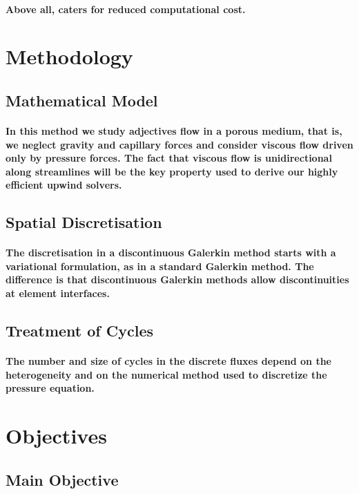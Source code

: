 \documentclass{article}
\begin{document}
	\paragraph{Above all, caters for reduced computational cost.}

	
	\section{Methodology}
	
\subsection{Mathematical Model}
	\paragraph{In this method we study adjectives flow in a porous medium, that is, we
	neglect gravity and capillary forces and consider viscous flow driven only by
	pressure forces. The fact that viscous flow is unidirectional along streamlines
	will be the key property used to derive our highly efficient upwind solvers.}
	\subsection{Spatial Discretisation}
 	\paragraph{The discretisation in a discontinuous Galerkin method starts with a variational formulation, as in a standard Galerkin method. The difference is that discontinuous Galerkin methods allow discontinuities
	at element interfaces.}
	
\subsection{Treatment of Cycles}
	\paragraph{The number and size of cycles in the discrete fluxes depend on the heterogeneity and on the numerical method used to discretize the pressure equation.}
	
	
\section{Objectives}
          \subsection{Main Objective}
\end{document}
